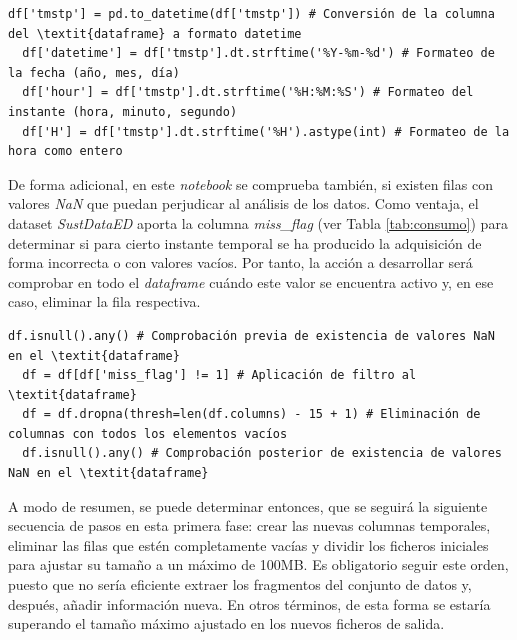 \vspace{3mm}

\begin{lstlisting}[style=Python-color, caption={Formato del timestamp}]
  df['tmstp'] = pd.to_datetime(df['tmstp']) # Conversión de la columna del \textit{dataframe} a formato datetime
  df['datetime'] = df['tmstp'].dt.strftime('%Y-%m-%d') # Formateo de la fecha (año, mes, día)
  df['hour'] = df['tmstp'].dt.strftime('%H:%M:%S') # Formateo del instante (hora, minuto, segundo)
  df['H'] = df['tmstp'].dt.strftime('%H').astype(int) # Formateo de la hora como entero
\end{lstlisting}

\vspace{3mm}

De forma adicional, en este \textit{notebook} se comprueba también, si existen filas con valores \textit{NaN} que puedan perjudicar al análisis de los datos. Como ventaja, el dataset \textit{SustDataED} aporta la columna \textit{miss\_flag} (ver Tabla \ref{tab:consumo}) para determinar si para cierto instante temporal se ha producido la adquisición de forma incorrecta o con valores vacíos. Por tanto, la acción a desarrollar será comprobar en todo el \textit{dataframe} cuándo este valor se encuentra activo y, en ese caso, eliminar la fila respectiva.

\vspace{3mm}

\begin{lstlisting}[style=Python, caption={Eliminación de valores NaN}]
  df.isnull().any() # Comprobación previa de existencia de valores NaN en el \textit{dataframe}
  df = df[df['miss_flag'] != 1] # Aplicación de filtro al \textit{dataframe}
  df = df.dropna(thresh=len(df.columns) - 15 + 1) # Eliminación de columnas con todos los elementos vacíos
  df.isnull().any() # Comprobación posterior de existencia de valores NaN en el \textit{dataframe}
\end{lstlisting}

\vspace{3mm}

A modo de resumen, se puede determinar entonces, que se seguirá la siguiente secuencia de pasos en esta primera fase: crear las nuevas columnas temporales, eliminar las filas que estén completamente vacías y dividir los ficheros iniciales para ajustar su tamaño a un máximo de 100MB. Es obligatorio seguir este orden, puesto que no sería eficiente extraer los fragmentos del conjunto de datos y, después, añadir información nueva. En otros términos, de esta forma se estaría superando el tamaño máximo ajustado en los nuevos ficheros de salida.

